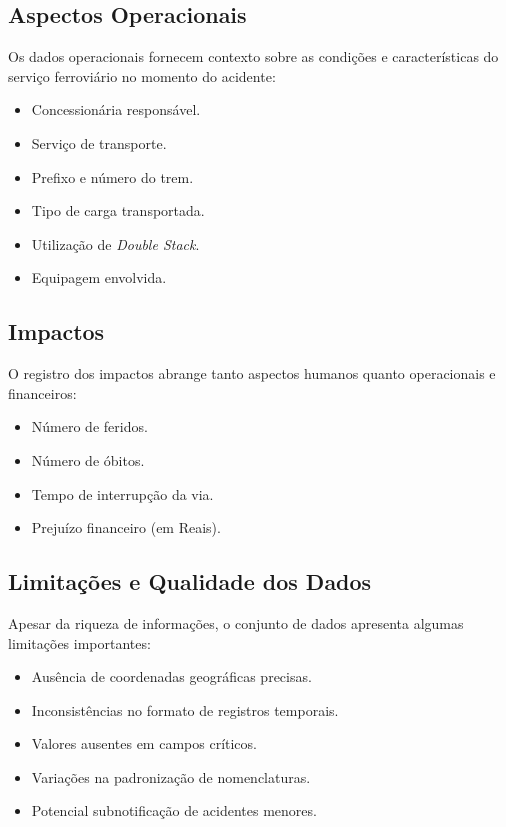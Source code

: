 \documentclass[conference]{IEEEtran}
\begin{document}
\subsection{Aspectos Operacionais}
Os dados operacionais fornecem contexto sobre as condições e características do serviço ferroviário no momento do acidente:

\begin{itemize}
\item Concessionária responsável.
\item Serviço de transporte.
\item Prefixo e número do trem.
\item Tipo de carga transportada.
\item Utilização de \textit{Double Stack}.
\item Equipagem envolvida.
\end{itemize}

\subsection{Impactos}
O registro dos impactos abrange tanto aspectos humanos quanto operacionais e financeiros:

\begin{itemize}
\item Número de feridos.
\item Número de óbitos.
\item Tempo de interrupção da via.
\item Prejuízo financeiro (em Reais).
\end{itemize}

\subsection{Limitações e Qualidade dos Dados}
Apesar da riqueza de informações, o conjunto de dados apresenta algumas limitações importantes:

\begin{itemize}
\item Ausência de coordenadas geográficas precisas.
\item Inconsistências no formato de registros temporais.
\item Valores ausentes em campos críticos.
\item Variações na padronização de nomenclaturas.
\item Potencial subnotificação de acidentes menores.
\end{itemize}
\end{document}
